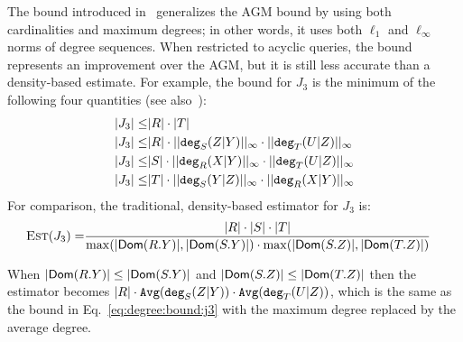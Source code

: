 The \maxdegree bound introduced in~\cite{DBLP:conf/pods/Khamis0S17}
generalizes the AGM bound by using both cardinalities and maximum
degrees; in other words, it uses both $\ell_1$ and $\ell_\infty$ norms
of degree sequences.  When restricted to acyclic queries, the
\maxdegree bound represents an improvement over the AGM, but it is
still less accurate than a density-based estimate.
%
%
For example, the bound for $J_3$ is the minimum of the following four
quantities (see also~\cite{DBLP:journals/pvldb/ChenHWSS22}):
%
\begin{align}
  |J_3|\leq & |R|\cdot |T| \nonumber \\
  |J_3|\leq & |R| \cdot ||\texttt{deg}_S(Z|Y)||_\infty \cdot||\texttt{deg}_T(U|Z)||_\infty\label{eq:degree:bound:j3}\\
  |J_3|\leq & |S|\cdot ||\texttt{deg}_R(X|Y)||_\infty \cdot  ||\texttt{deg}_T(U|Z)||_\infty \nonumber \\
  |J_3| \leq &|T|\cdot ||\texttt{deg}_S(Y|Z)||_\infty \cdot ||\texttt{deg}_R(X|Y)||_\infty \nonumber 
\end{align}
%
For comparison, the traditional, density-based estimator for $J_3$ is:
%
{
\begin{align*}
  \textsc{Est}(J_3)=&\frac{|R|\cdot|S|\cdot|T|}{\max(|\textsf{Dom}(R.Y)|,|\textsf{Dom}(S.Y)|)\cdot\max(|\textsf{Dom}(S.Z)|,|\textsf{Dom}(T.Z)|)}
\end{align*}
}

When $|\textsf{Dom}(R.Y)|\leq |\textsf{Dom}(S.Y)|$ and $|\textsf{Dom}(S.Z)|\leq |\textsf{Dom}(T.Z)|$
then the estimator becomes
$|R|\cdot
\texttt{Avg}(\texttt{deg}_S(Z|Y))\cdot\texttt{Avg}(\texttt{deg}_T(U|Z))$, which
is the same as the \maxdegree bound in Eq.~\eqref{eq:degree:bound:j3}
with the maximum degree replaced by the average degree.

